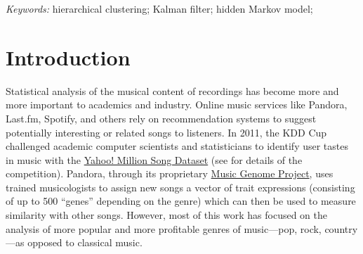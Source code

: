 \documentclass[12pt]{article}
\def\spacingset#1{\renewcommand{\baselinestretch}%
{#1}\small\normalsize} \spacingset{1}
\newcommand{\attn}[1]{\textcolor{red}{Note: #1}}
\begin{document}
\noindent%
{\it Keywords:} hierarchical clustering; Kalman filter; hidden Markov
model; 
\vfill

\newpage

\spacingset{1.45} %











\section{Introduction}
\label{sec:introduction}


Statistical analysis of the musical content of recordings has
become more and more important to academics and industry. Online
music services like Pandora, Last.fm, Spotify, and others rely on
recommendation systems to suggest potentially interesting or related
songs to listeners. In 2011, the KDD Cup challenged academic computer
scientists and statisticians to identify user tastes in music with the
\href{http://labrosa.ee.columbia.edu/millionsong/}{Yahoo! Million
  Song Dataset} (see \citet{DrorKoenigstein2012} for details of the
competition). Pandora, through its proprietary
\href{https://www.pandora.com/about/mgp}{Music Genome Project}, uses
trained musicologists to assign new songs a vector of trait
expressions (consisting of up to 500 ``genes'' depending on the genre)
which can then be used to measure similarity with other
songs. However, most of this work has focused on the analysis of more popular
and more profitable genres of music---pop, rock, country---as opposed
to classical music. 
\end{document}
